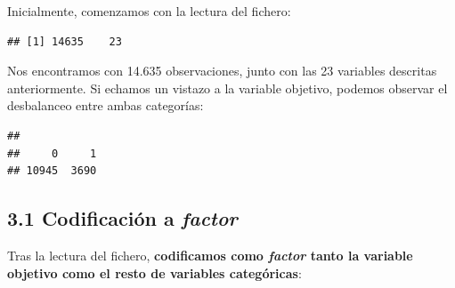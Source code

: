 \documentclass[
]{article}
\newenvironment{Shaded}{\begin{snugshade}}{\end{snugshade}}
\newcommand{\CommentTok}[1]{\textcolor[rgb]{0.56,0.35,0.01}{\textit{#1}}}
\newcommand{\DataTypeTok}[1]{\textcolor[rgb]{0.13,0.29,0.53}{#1}}
\newcommand{\KeywordTok}[1]{\textcolor[rgb]{0.13,0.29,0.53}{\textbf{#1}}}
\newcommand{\NormalTok}[1]{#1}
\newcommand{\OperatorTok}[1]{\textcolor[rgb]{0.81,0.36,0.00}{\textbf{#1}}}
\newcommand{\OtherTok}[1]{\textcolor[rgb]{0.56,0.35,0.01}{#1}}
\newcommand{\StringTok}[1]{\textcolor[rgb]{0.31,0.60,0.02}{#1}}
\begin{document}
Inicialmente, comenzamos con la lectura del fichero:

\begin{Shaded}
\end{Shaded}

\begin{verbatim}
## [1] 14635    23
\end{verbatim}

Nos encontramos con 14.635 observaciones, junto con las 23 variables
descritas anteriormente. Si echamos un vistazo a la variable objetivo,
podemos observar el desbalanceo entre ambas categorías:

\begin{Shaded}
\end{Shaded}

\begin{verbatim}
## 
##     0     1 
## 10945  3690
\end{verbatim}

\hypertarget{codificaciuxf3n-a-factor}{%
\subsection{\texorpdfstring{3.1 Codificación a
\emph{factor}}{3.1 Codificación a factor}}\label{codificaciuxf3n-a-factor}}

Tras la lectura del fichero, \textbf{codificamos como \emph{factor}
tanto la variable objetivo como el resto de variables categóricas}:
\end{document}
